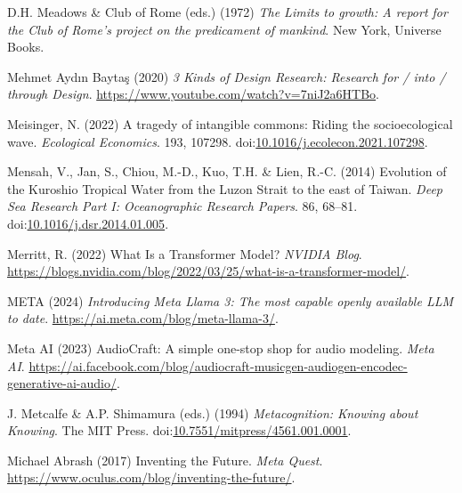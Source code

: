 \documentclass[
  letterpaper,
  DIV=11,
  numbers=noendperiod]{scrartcl}
\newlength{\cslhangindent}
\newenvironment{CSLReferences}[2] %
 {\begin{list}{}{%
  \setlength{\itemindent}{0pt}
  \setlength{\leftmargin}{0pt}
  \setlength{\parsep}{0pt}
  \ifodd #1
   \setlength{\leftmargin}{\cslhangindent}
   \setlength{\itemindent}{-1\cslhangindent}
  \fi
  \setlength{\itemsep}{#2\baselineskip}}}
 {\end{list}}
\begin{document}
\begin{CSLReferences}{0}{1}
D.H. Meadows \& Club of Rome (eds.) (1972) \emph{The {Limits} to growth:
A report for the {Club} of {Rome}'s project on the predicament of
mankind}. New York, Universe Books.

Mehmet Aydın Baytaş (2020) \emph{3 {Kinds} of {Design Research}:
{Research} for / into / through {Design}}.
\url{https://www.youtube.com/watch?v=7niJ2a6HTBo}.

Meisinger, N. (2022) A tragedy of intangible commons: {Riding} the
socioecological wave. \emph{Ecological Economics}. 193, 107298.
doi:\href{https://doi.org/10.1016/j.ecolecon.2021.107298}{10.1016/j.ecolecon.2021.107298}.

Mensah, V., Jan, S., Chiou, M.-D., Kuo, T.H. \& Lien, R.-C. (2014)
Evolution of the {Kuroshio Tropical Water} from the {Luzon Strait} to
the east of {Taiwan}. \emph{Deep Sea Research Part I: Oceanographic
Research Papers}. 86, 68--81.
doi:\href{https://doi.org/10.1016/j.dsr.2014.01.005}{10.1016/j.dsr.2014.01.005}.

Merritt, R. (2022) What {Is} a {Transformer Model}? \emph{NVIDIA Blog}.
\url{https://blogs.nvidia.com/blog/2022/03/25/what-is-a-transformer-model/}.

META (2024) \emph{Introducing {Meta Llama} 3: {The} most capable openly
available {LLM} to date}. \url{https://ai.meta.com/blog/meta-llama-3/}.

Meta AI (2023) {AudioCraft}: {A} simple one-stop shop for audio
modeling. \emph{Meta AI}.
\url{https://ai.facebook.com/blog/audiocraft-musicgen-audiogen-encodec-generative-ai-audio/}.

J. Metcalfe \& A.P. Shimamura (eds.) (1994) \emph{Metacognition:
{Knowing} about {Knowing}}. The MIT Press.
doi:\href{https://doi.org/10.7551/mitpress/4561.001.0001}{10.7551/mitpress/4561.001.0001}.

Michael Abrash (2017) Inventing the {Future}. \emph{Meta Quest}.
\url{https://www.oculus.com/blog/inventing-the-future/}.


\end{CSLReferences}
\end{document}
